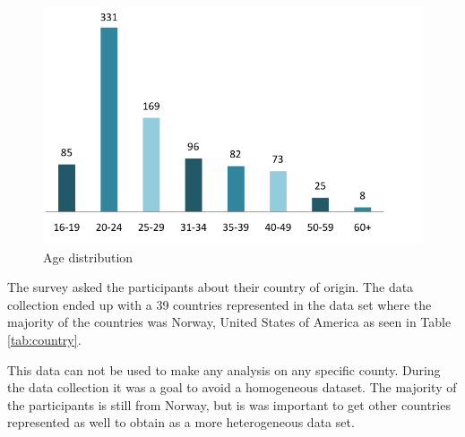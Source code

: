     \begin{figure}[H]
      \centering
      \includegraphics[scale=0.8]{pics/analysis/AgeDist.png}
      \caption{Age distribution}
      \label{fig:ageDistribution}
    \end{figure}

    The survey asked the participants about their country of origin. The data collection ended up with a 39 countries represented in the data set where the majority of the countries was Norway, United States of America as seen in Table \ref{tab:country}.

    This data can not be used to make any analysis on any specific county. During the data collection it was a goal to avoid a homogeneous dataset. The majority of the participants is still from Norway, but is was important to get other countries represented as well to obtain as a more heterogeneous data set. 

